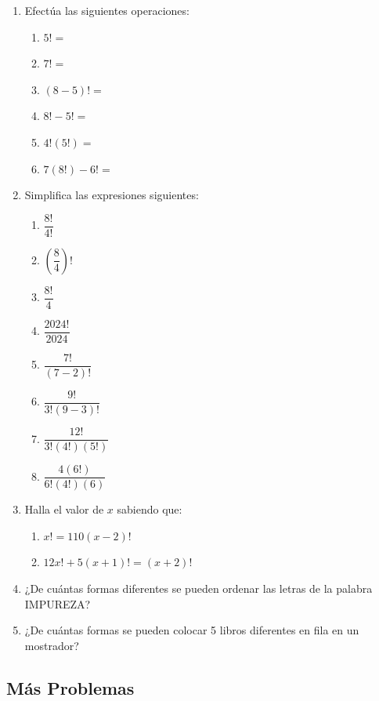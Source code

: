 \begin{enumerate}
    \item Efectúa las siguientes operaciones:
    \begin{multicols}{3}
     \begin{enumerate}
        \item $5!=$
        \item $7!=$
        \item $(8-5)!=$
        \item $8!-5!=$
        \item $4!(5!)=$
        \item $7(8!)-6!=$
    \end{enumerate}   
    \end{multicols}
    

    \item Simplifica las expresiones siguientes:
    \begin{multicols}{3}
        \begin{enumerate}
        \item $\dfrac{8!}{4!}$
        \item $\left(\dfrac{8}{4}\right)!$
        \item $\dfrac{8!}{4}$
        \item $\dfrac{2024!}{2024}$
        \item $\dfrac{7!}{(7-2)!}$
        \item $\dfrac{9!}{3!(9-3)!}$
        \item $\dfrac{12!}{3!(4!)(5!)}$
        \item $\dfrac{4(6!)}{6!(4!)(6)}$
    \end{enumerate}
    \end{multicols}
    \item Halla el valor de $x$ sabiendo que:
    \begin{enumerate}
        \item $x!=110(x-2)!$
        \item $12x! + 5(x+1)!=(x+2)!$
    \end{enumerate}

    \item ¿De cuántas formas diferentes se pueden ordenar las letras de la palabra IMPUREZA?
    \item ¿De cuántas formas se pueden colocar 5 libros diferentes en fila en un mostrador?
\end{enumerate}

\subsection*{Más Problemas}

